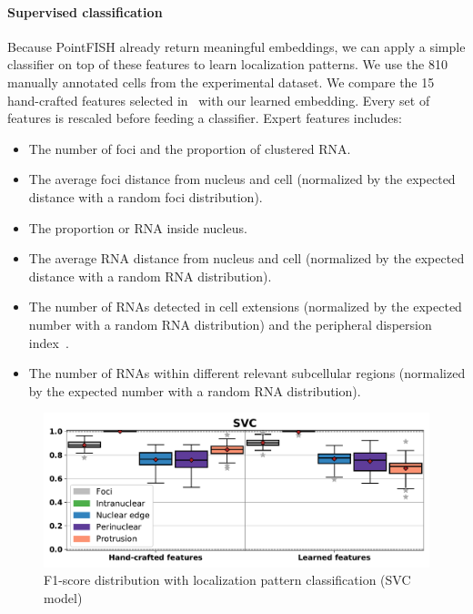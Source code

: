 \paragraph{Supervised classification}

Because PointFISH already return meaningful embeddings, we can apply a simple classifier on top of these features to learn localization patterns.
We use the 810 manually annotated cells from the experimental dataset.
We compare the 15 hand-crafted features selected in~\cite{CHOUAIB_2020} with our learned embedding.
Every set of features is rescaled before feeding a classifier.
Expert features includes:

\begin{itemize}
	\item The number of foci and the proportion of clustered \ac{RNA}.
	\item The average foci distance from nucleus and cell (normalized by the expected distance with a random foci distribution).
	\item The proportion or \ac{RNA} inside nucleus.
	\item The average \ac{RNA} distance from nucleus and cell (normalized by the expected distance with a random \ac{RNA} distribution).
	\item The number of \ac{RNA}s detected in cell extensions (normalized by the expected number with a random \ac{RNA} distribution) and the peripheral dispersion index~\cite{stueland_rdi_2019}.
	\item The number of \ac{RNA}s within different relevant subcellular regions (normalized by the expected number with a random \ac{RNA} distribution).
\end{itemize}

\begin{figure}[h]
    \centering
	\includegraphics[clip, trim=0cm 0cm 0cm 1cm, width=\textwidth]{figures/chapter4/f1_SVC}
    \caption{F1-score distribution with localization pattern classification (SVC model)}
    \label{fig:f1_SVC_real}
\end{figure}

